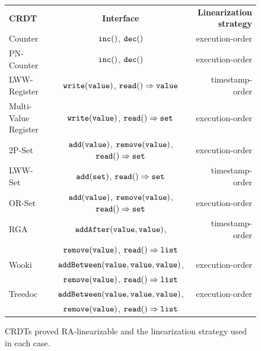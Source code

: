 \begin{figure}[t]
{\footnotesize
\begin{tabular}{|l|c|r|}
\hline
{\bf CRDT} & {\bf Interface} & {\bf Linearization strategy}\\
\hhline{|===|}
Counter~\cite{ShapiroPBZ11}&$\alabelshort[{\tt inc}]{}$, $\alabelshort[{\tt dec}]{}$ & execution-order \\
\hline
PN-Counter~\cite{ShapiroPBZ11}&$\alabelshort[{\tt inc}]{}$, $\alabelshort[{\tt dec}]{}$ & execution-order \\
\hline
LWW-Register~\cite{DBLP:journals/rfc/rfc677}&$\alabelshort[{\tt write}]{value}$, $\alabellong[{\tt read}]{}{value}{}$ & timestamp-order\\
\hline
Multi-Value Register~\cite{DBLP:conf/sosp/DeCandiaHJKLPSVV07}&$\alabelshort[{\tt write}]{value}$, $\alabellong[{\tt read}]{}{set}{}$ & execution-order\\
\hline
2P-Set~\cite{ShapiroPBZ11}&$\alabelshort[{\tt add}]{value}$, $\alabelshort[{\tt remove}]{value}$, $\alabellong[{\tt read}]{}{set}{}$ & execution-order\\
\hline
LWW-Set~\cite{ShapiroPBZ11}&$\alabelshort[{\tt add}]{set}$, $\alabellong[{\tt read}]{}{set}{}$ & timestamp-order\\
\hline
OR-Set~\cite{ShapiroPBZ11}&$\alabelshort[{\tt add}]{value}$, $\alabelshort[{\tt remove}]{value}$, $\alabellong[{\tt read}]{}{set}{}$ & execution-order\\
\hline
RGA~\cite{DBLP:journals/jpdc/RohJKL11}&$\alabelshort[{\tt addAfter}]{value,value}$, & timestamp-order
                \\ & $\alabelshort[{\tt remove}]{value}$, $\alabellong[{\tt read}]{}{list}{}$ & \\
\hline
Wooki~\cite{DBLP:conf/wise/WeissUM07}&$\alabelshort[{\tt addBetween}]{value,value,value}$, & execution-order
                \\ & $\alabelshort[{\tt remove}]{value}$, $\alabellong[{\tt read}]{}{list}{}$ & \\
\hline
Treedoc~\cite{DBLP:conf/icdcs/PreguicaMSL09}&$\alabelshort[{\tt addBetween}]{value,value,value}$, & execution-order
                \\ & $\alabelshort[{\tt remove}]{value}$, $\alabellong[{\tt read}]{}{list}{}$ & \\
\hline
\end{tabular}
}
\caption{CRDTs proved RA-linearizable and the linearization strategy used in each case.}
\label{fig:crdt-implementaton of this paper, their correctness, and their interface}
\end{figure}

